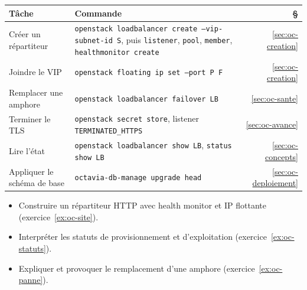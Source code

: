 \begin{center}
\renewcommand{\arraystretch}{1.35}
\begin{tabular}{@{}>{\raggedright\arraybackslash}p{4.2cm}>{\raggedright\arraybackslash}p{9.9cm}r@{}}
\toprule
\textbf{Tâche} & \textbf{Commande} & \textbf{§} \\
\midrule
Créer un répartiteur & \texttt{openstack loadbalancer create --vip-subnet-id S}, puis \texttt{listener}, \texttt{pool}, \texttt{member}, \texttt{healthmonitor create} & \ref{sec:oc-creation} \\
Joindre le VIP & \texttt{openstack floating ip set --port P F} & \ref{sec:oc-creation} \\
Remplacer une amphore & \texttt{openstack loadbalancer failover LB} & \ref{sec:oc-sante} \\
Terminer le TLS & \texttt{openstack secret store}, listener \texttt{TERMINATED\_\allowbreak HTTPS} & \ref{sec:oc-avance} \\
Lire l'état & \texttt{openstack loadbalancer show LB}, \texttt{status show LB} & \ref{sec:oc-concepts} \\
Appliquer le schéma de base & \texttt{octavia-db-manage upgrade head} & \ref{sec:oc-deploiement} \\
\bottomrule
\end{tabular}
\end{center}

\begin{savoirfaire}
\begin{itemize}
  \item Construire un répartiteur HTTP avec health monitor et IP flottante (exercice~\ref{ex:oc-site}).
  \item Interpréter les statuts de provisionnement et d'exploitation (exercice~\ref{ex:oc-statuts}).
  \item Expliquer et provoquer le remplacement d'une amphore (exercice~\ref{ex:oc-panne}).
\end{itemize}
\end{savoirfaire}
